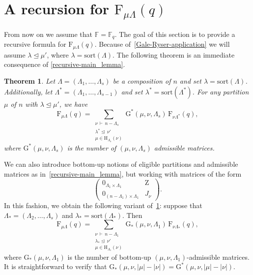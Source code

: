 \documentclass[12pt,a4paper,reqno]{amsart}
\theoremstyle{plain}
\newtheorem{theorem}{Theorem}[section]
\theoremstyle{definition}
\newcommand{\less}{\unlhd}
\newcommand{\FF}{{\mathbb{F}}}
\newcommand{\1}{\mathds{1}}
\newcommand{\G}{{\mathrm{G}}}
\newcommand{\F}{\mathrm{F}}
\newcommand{\HH}{\mathrm{H}}
\newcommand{\Z}{\mathrm{Z}}
\begin{document}
\section{A recursion for $\F_{\mu\Lambda}(q)$}
\label{sec:rec}
From now on we assume that $\FF=\FF_q$. 
The goal of this section is to provide a recursive formula for $\F_{\mu\Lambda}(q)$. Because of~\cref{Gale-Ryser-application} we will assume $\lambda\less \mu'$, where $\lambda=\mathrm{sort}(\Lambda)$. The following theorem is an immediate consequence of 
\cref{recursive-main_lemma}. 
\begin{theorem}\label{recursive_theortem} Let $\Lambda = (\Lambda_1, \dots, \Lambda_s)$ be a composition of $n$ and set $\lambda = \mathrm{sort}(\Lambda)$. Additionally, let $\Lambda^* = (\Lambda_1, \dots, \Lambda_{s-1})$ and set $\lambda^* = \mathrm{sort}(\Lambda^*)$. For any partition $\mu$ of $n$ with $\lambda \less \mu'$, we have
\begin{equation}\label{F_recursive}
\F_{\mu\Lambda}(q)=\sum_{\substack{\nu\, \vdash\, n-\Lambda_s\\[0.06cm] \lambda^*\less\, \nu' \\[0.06cm] \mu\in \HH_{\Lambda_s}(\nu)}} \G^*(\mu,\nu,\Lambda_s)\, \F_{\nu\Lambda^*}(q),
\end{equation}  
where $\G^*(\mu,\nu,\Lambda_s)$ is the number of $(\mu,\nu,\Lambda_s)$ admissible matrices. 
\end{theorem}

We can also introduce bottom-up notions of eligible partitions and admissible matrices as in~\cref{recursive-main_lemma}, but working with  
matrices of the form
$$
\left(\begin{array}{c|c}
0_{\Lambda_1\times\Lambda_1} & \Z\\ \hline
0_{(n-\Lambda_1)\times\Lambda_1} & J_\nu
\end{array}\right).
$$
In this fashion, we obtain the following variant of~\cref{recursive_theortem}: suppose that 
$\Lambda_*=(\Lambda_2,\dots,\Lambda_s)$ and $\lambda_*=\mathrm{sort}(\Lambda_*)$.
Then
\begin{equation}\label{F_recursive_modify}
\F_{\mu\Lambda}(q)=\sum_{\substack{\nu\, \vdash\, n-\Lambda_1\\[0.06cm] \lambda_*\less\, \nu' \\[0.06cm] \mu\in \HH_{\Lambda_1}(\nu)}} \G_*(\mu,\nu,\Lambda_1)\, \F_{\nu\Lambda_*}(q),
\end{equation}
where 
$\G_*(\mu,\nu,\Lambda_1)$ is the number of bottom-up $(\mu,\nu,\Lambda_1)$-admissible matrices. 
It is straightforward to verify that 
$\G_*(\mu,\nu,|\mu|-|\nu|)=\G^*(\mu,\nu,|\mu|-|\nu|)$.
\end{document}
